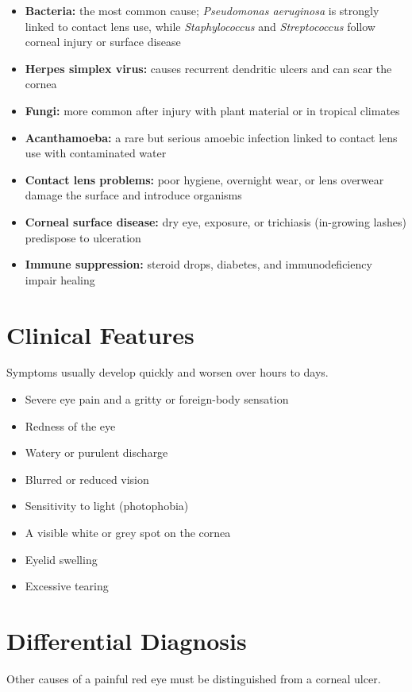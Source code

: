\begin{itemize}
    \item \textbf{Bacteria:} the most common cause; \textit{Pseudomonas aeruginosa} is strongly linked to contact lens use, while \textit{Staphylococcus} and \textit{Streptococcus} follow corneal injury or surface disease
    \item \textbf{Herpes simplex virus:} causes recurrent dendritic ulcers and can scar the cornea
    \item \textbf{Fungi:} more common after injury with plant material or in tropical climates
    \item \textbf{Acanthamoeba:} a rare but serious amoebic infection linked to contact lens use with contaminated water
    \item \textbf{Contact lens problems:} poor hygiene, overnight wear, or lens overwear damage the surface and introduce organisms
    \item \textbf{Corneal surface disease:} dry eye, exposure, or trichiasis (in-growing lashes) predispose to ulceration
    \item \textbf{Immune suppression:} steroid drops, diabetes, and immunodeficiency impair healing
\end{itemize}

\section*{Clinical Features}
Symptoms usually develop quickly and worsen over hours to days.

\begin{itemize}
    \item Severe eye pain and a gritty or foreign-body sensation
    \item Redness of the eye
    \item Watery or purulent discharge
    \item Blurred or reduced vision
    \item Sensitivity to light (photophobia)
    \item A visible white or grey spot on the cornea
    \item Eyelid swelling
    \item Excessive tearing
\end{itemize}

\section*{Differential Diagnosis}
Other causes of a painful red eye must be distinguished from a corneal ulcer.

